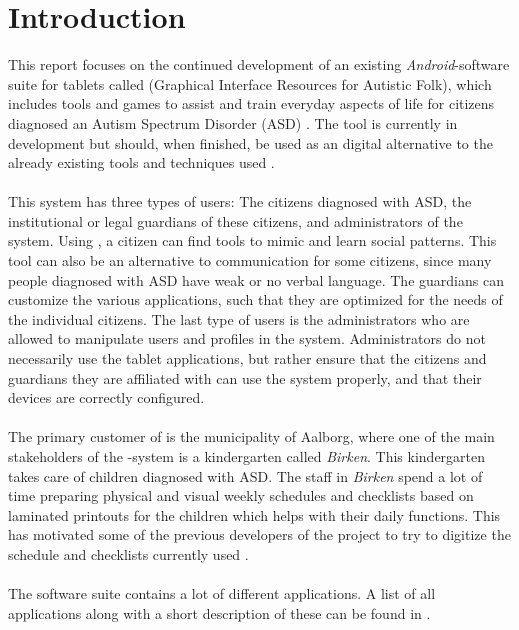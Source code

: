 \chapter{Introduction}
\label{cha:introduction}

This report focuses on the continued development of an existing \emph{Android}-software suite for tablets called \giraf (Graphical Interface Resources for Autistic Folk), which includes tools and games to assist and train everyday aspects of life for citizens diagnosed an Autism Spectrum Disorder (ASD) \parencite{asd}. The tool is currently in development but should, when finished, be used as an digital alternative to the already existing tools and techniques used \parencite{birken_slides}.
\\\\ 
This system has three types of users: The citizens diagnosed with ASD, the institutional or legal guardians of these citizens, and administrators of the system. Using \giraf, a citizen can find tools to mimic and learn social patterns. This tool can also be an alternative to communication for some citizens, since many people diagnosed with ASD have weak or no verbal language. The guardians can customize the various applications, such that they are optimized for the needs of the individual citizens. The last type of users is the administrators who are allowed to manipulate users and profiles in the system. Administrators do not necessarily use the \giraf tablet applications, but rather ensure that the citizens and guardians they are affiliated with can use the system properly, and that their devices are correctly configured.
\\\\
The primary customer of \giraf is the municipality of Aalborg, where one of the main stakeholders of the \giraf-system is a kindergarten called \emph{Birken}. This kindergarten takes care of children diagnosed with ASD. The staff in \emph{Birken} spend a lot of time preparing physical and visual weekly schedules and checklists based on laminated printouts for the children which helps with their daily functions. This has motivated some of the previous developers of the \giraf project to try to digitize the schedule and checklists currently used \parencite{birken_slides}.
\\\\
The \giraf software suite contains a lot of different applications. A list of all applications along with a short description of these can be found in .



